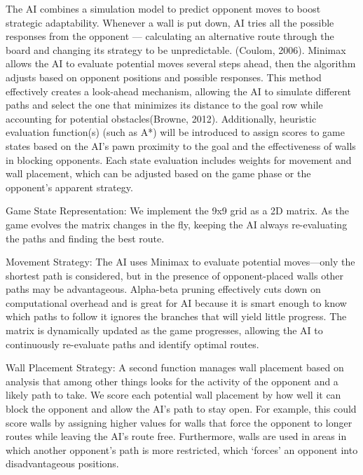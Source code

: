 \documentclass[12pt]{report}
\begin{document}
The AI combines a simulation model to predict opponent moves to boost strategic adaptability. Whenever a wall is put down, AI tries all the possible responses from the opponent — calculating an alternative route through the board and changing its strategy to be unpredictable. (Coulom, 2006). Minimax allows the AI to evaluate potential moves several steps ahead, then the algorithm adjusts based on opponent positions and possible responses. This method effectively creates a look-ahead mechanism, allowing the AI to simulate different paths and select the one that minimizes its distance to the goal row while accounting for potential obstacles(Browne, 2012). Additionally, heuristic evaluation function(s) (such as A*) will be introduced to assign scores to game states based on the AI’s pawn proximity to the goal and the effectiveness of walls in blocking opponents. Each state evaluation includes weights for movement and wall placement, which can be adjusted based on the game phase or the opponent’s apparent strategy.

Game State Representation: We implement the 9x9 grid as a 2D matrix. As the game evolves the matrix changes in the fly, keeping the AI always re-evaluating the paths and finding the best route.

Movement Strategy: The AI uses Minimax to evaluate potential moves—only the shortest path is considered, but in the presence of opponent-placed walls other paths may be advantageous. Alpha-beta pruning effectively cuts down on computational overhead and is great for AI because it is smart enough to know which paths to follow it ignores the branches that will yield little progress. The matrix is dynamically updated as the game progresses, allowing the AI to continuously re-evaluate paths and identify optimal routes.

Wall Placement Strategy: A second function manages wall placement based on analysis that among other things looks for the activity of the opponent and a likely path to take. We score each potential wall placement by how well it can block the opponent and allow the AI's path to stay open. For example, this could score walls by assigning higher values for walls that force the opponent to longer routes while leaving the AI’s route free. Furthermore, walls are used in areas in which another opponent's path is more restricted, which ‘forces’ an opponent into disadvantageous positions.
\end{document}
